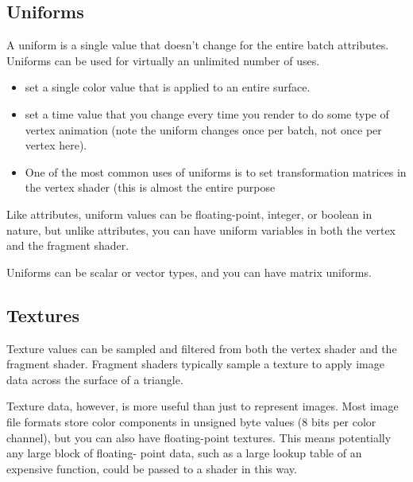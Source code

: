 
\subsection{Uniforms}
\label{sec:uniforms}

A uniform is a single value that doesn't change for the entire batch
attributes. Uniforms can be used for virtually an unlimited number of
uses.

\begin{itemize}
\item set a single color value that is applied to an entire surface. 
\item set a time value that you change every time you render to do
  some type of vertex animation (note the uniform changes once per
  batch, not once per vertex here).

\item One of the most common uses of uniforms is to set transformation
  matrices in the vertex shader (this is almost the entire purpose
\end{itemize}
Like attributes, uniform values can be floating-point, integer, or
boolean in nature, but unlike attributes, you can have uniform
variables in both the vertex and the fragment shader.

\begin{framed}
  Uniforms can be scalar or vector types, and you can have matrix uniforms.
\end{framed}


\subsection{Textures}
\label{sec:textures}

Texture values can be sampled and filtered from both the vertex shader
and the fragment shader.  Fragment shaders typically sample a texture
to apply image data across the surface of a triangle.

Texture data, however, is more useful than just to represent
images. Most image file formats store color components in unsigned
byte values (8 bits per color channel), but you can also have
floating-point textures. This means potentially any large block of
floating- point data, such as a large lookup table of an expensive
function, could be passed to a shader in this way.

